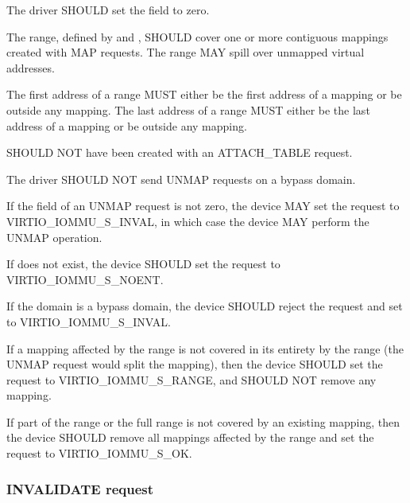 The driver SHOULD set the  field to zero.

The range, defined by  and , SHOULD
cover one or more contiguous mappings created with MAP requests. The range
MAY spill over unmapped virtual addresses.

The first address of a range MUST either be the first address of a mapping
or be outside any mapping. The last address of a range MUST either be the
last address of a mapping or be outside any mapping.

 SHOULD NOT have been created with an ATTACH_TABLE
request.

The driver SHOULD NOT send UNMAP requests on a bypass domain.


If the  field of an UNMAP request is not zero, the device
MAY set the request  to VIRTIO_IOMMU_S_INVAL, in which case
the device MAY perform the UNMAP operation.

If  does not exist, the device SHOULD set the request
 to VIRTIO_IOMMU_S_NOENT.

If the domain is a bypass domain, the device SHOULD reject the
request and set  to VIRTIO_IOMMU_S_INVAL.

If a mapping affected by the range is not covered in its entirety by the
range (the UNMAP request would split the mapping), then the device SHOULD
set the request  to VIRTIO_IOMMU_S_RANGE, and SHOULD NOT
remove any mapping.

If part of the range or the full range is not covered by an existing
mapping, then the device SHOULD remove all mappings affected by the range
and set the request  to VIRTIO_IOMMU_S_OK.

\subsubsection{INVALIDATE request}\label{sec:Device Types / IOMMU Device / Device operations / INVALIDATE request}

